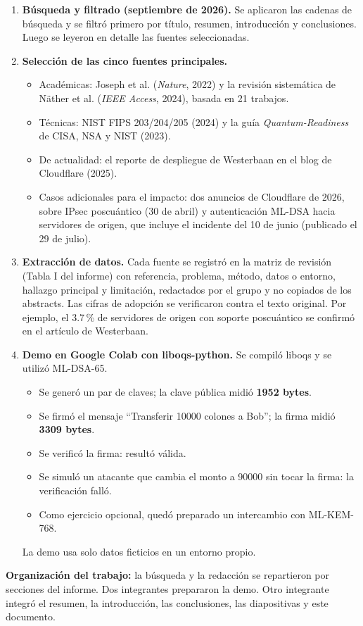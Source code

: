 \begin{enumerate}[leftmargin=*]
  \item \textbf{Búsqueda y filtrado (septiembre de 2026).} Se aplicaron las cadenas de búsqueda y se filtró primero por título, resumen, introducción y conclusiones. Luego se leyeron en detalle las fuentes seleccionadas.
  \item \textbf{Selección de las cinco fuentes principales.}
  \begin{itemize}
    \item Académicas: Joseph et al. (\textit{Nature}, 2022) y la revisión sistemática de Näther et al. (\textit{IEEE Access}, 2024), basada en 21 trabajos.
    \item Técnicas: NIST FIPS 203/204/205 (2024) y la guía \textit{Quantum-Readiness} de CISA, NSA y NIST (2023).
    \item De actualidad: el reporte de despliegue de Westerbaan en el blog de Cloudflare (2025).
    \item Casos adicionales para el impacto: dos anuncios de Cloudflare de 2026, sobre IPsec poscuántico (30 de abril) y autenticación ML-DSA hacia servidores de origen, que incluye el incidente del 10 de junio (publicado el 29 de julio).
  \end{itemize}
  \item \textbf{Extracción de datos.} Cada fuente se registró en la matriz de revisión (Tabla I del informe) con referencia, problema, método, datos o entorno, hallazgo principal y limitación, redactados por el grupo y no copiados de los abstracts. Las cifras de adopción se verificaron contra el texto original. Por ejemplo, el 3.7\,\% de servidores de origen con soporte poscuántico se confirmó en el artículo de Westerbaan.
  \item \textbf{Demo en Google Colab con liboqs-python.} Se compiló liboqs y se utilizó ML-DSA-65.
  \begin{itemize}
    \item Se generó un par de claves; la clave pública midió \textbf{1952 bytes}.
    \item Se firmó el mensaje ``Transferir 10000 colones a Bob''; la firma midió \textbf{3309 bytes}.
    \item Se verificó la firma: resultó válida.
    \item Se simuló un atacante que cambia el monto a 90000 sin tocar la firma: la verificación falló.
    \item Como ejercicio opcional, quedó preparado un intercambio con ML-KEM-768.
  \end{itemize}
  La demo usa solo datos ficticios en un entorno propio.
\end{enumerate}

\textbf{Organización del trabajo:} la búsqueda y la redacción se repartieron por secciones del informe. Dos integrantes prepararon la demo. Otro integrante integró el resumen, la introducción, las conclusiones, las diapositivas y este documento.
